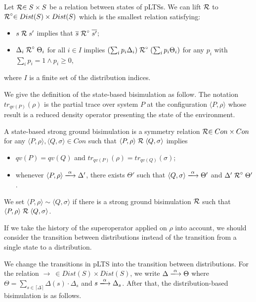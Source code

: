 \documentclass[runningheads]{llncs}
\newcommand{\lift}[1]{\mathrel{{#1}^\circ}}
\newcommand{\pair}[1]{\langle{#1}\rangle}
\begin{document}
\begin{definition}\label{def:lift_rel}
Let $\mathrel{{\mathcal R }} \in S\times S$ be a relation between states of pLTSs. We can lift $\mathrel{{\mathcal R }}$ to $\lift{\aRel}\in Dist(S)\times Dist(S)$ which is the smallest relation satisfying:
\begin{itemize}
    \item $s\mathrel{{\mathcal R }} s'$ implies that $\overline{s}\lift{\aRel} \overline{s'}$;
    \item $\Delta_{i}\lift{\aRel}\Theta_{i}$ for all $i\in I$ implies $(\sum_{i}p_{i}\Delta_{i})\lift{\aRel}(\sum_{i}p_{i}\Theta_{i})$ for any $p_{i}$ with $\sum_{i}p_{i}=1\wedge p_{i}\geq 0$,
\end{itemize}
where $I$ is a finite set of the distribution indices.
\end{definition}

We give the definition of the state-based bisimulation as follow. The notation $tr_{qv(P)}(\rho)$ is the partial trace over system $P$ at the configuration $\pair{P,\rho}$ whose result is a reduced density operator presenting the state of the environment.

\begin{definition}\label{def:state_strong_bisim}
\label{def:state-based strong ground bisimulation}
A state-based strong ground bisimulation is a symmetry relation $\mathrel{{\mathcal R }}\in Con\times Con$ for any $\langle P,\rho\rangle, \langle Q,\sigma\rangle\in Con$ such that $\langle P,\rho\rangle\mathrel{{\mathcal R }}\langle Q,\sigma\rangle$ implies
\begin{itemize}
    \item $qv(P)=qv(Q)$ and $tr_{qv(P)}(\rho)=tr_{qv(Q)}(\sigma)$;
    \item whenever $\langle P,\rho\rangle\xlongrightarrow{\alpha}\Delta'$, there exists $\Theta'$ such that $\langle Q,\sigma\rangle\xlongrightarrow{\alpha}\Theta'$ and $\Delta'\lift{\aRel}\Theta'$.
\end{itemize}
\end{definition}
We set $\langle P,\rho\rangle\sim\langle Q,\sigma\rangle$ if there is a strong ground bisimulation $\mathrel{{\mathcal R }}$ such that $\langle P,\rho\rangle\mathrel{{\mathcal R }}\langle Q,\sigma\rangle$.

If we take the history of the superoperator applied on $\rho$ into account, we should consider the transition between distributions instead of the transition from a single state to a distribution.

We change the transitions in pLTS into the transition between distributions. For the relation $\rightarrow\ \in Dist(S)\times Dist(S)$, we write $\Delta\xlongrightarrow{\alpha}\Theta$ where $\Theta=\sum\nolimits_{s\in\lceil\Delta\rceil}\Delta(s)\cdot\Delta_{s}$ and $s\xlongrightarrow{\alpha}\Delta_{s}$. After that, the distribution-based bisimulation is as follows.
\end{document}

